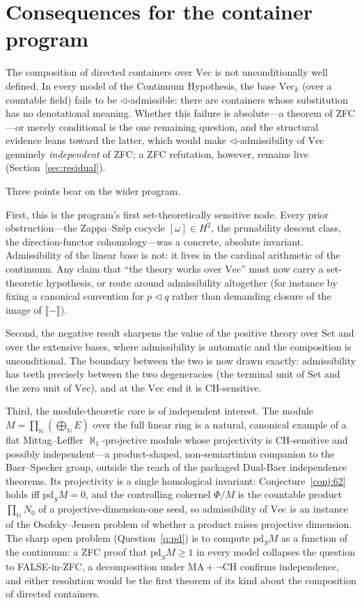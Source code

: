\documentclass[11pt,reqno]{amsart}
\theoremstyle{plain}
\theoremstyle{definition}
\theoremstyle{remark}
\renewcommand{\Vec}{\mathrm{Vec}}
\newcommand{\Set}{\mathrm{Set}}
\newcommand{\pd}{\mathrm{pd}}
\newcommand{\tri}{\triangleleft}
\newcommand{\den}[1]{\llbracket #1 \rrbracket}
\newcommand{\N}{\mathbb{N}}
\begin{document}
\section{Consequences for the container program}\label{sec:concl}

The composition of directed containers over $\Vec$ is not unconditionally well defined. In every model of the Continuum Hypothesis, the base $\Vec_k$ (over a countable field) fails to be $\tri$-admissible: there are containers whose substitution has no denotational meaning. Whether this failure is absolute---a theorem of ZFC---or merely conditional is the one remaining question, and the structural evidence leans toward the latter, which would make $\tri$-admissibility of $\Vec$ genuinely \emph{independent} of ZFC; a ZFC refutation, however, remains live (Section~\ref{sec:residual}).

Three points bear on the wider program.

First, this is the program's first set-theoretically sensitive node. Every prior obstruction---the Zappa--Sz\'ep cocycle $[\omega]\in H^2$, the prunability descent class, the direction-functor cohomology---was a concrete, absolute invariant. Admissibility of the linear base is not: it lives in the cardinal arithmetic of the continuum. Any claim that ``the theory works over $\Vec$'' must now carry a set-theoretic hypothesis, or route around admissibility altogether (for instance by fixing a canonical convention for $p\tri q$ rather than demanding closure of the image of $\den{-}$).

Second, the negative result sharpens the value of the positive theory over $\Set$ and over the extensive bases, where admissibility is automatic and the composition is unconditional. The boundary between the two is now drawn exactly: admissibility has teeth precisely between the two degeneracies (the terminal unit of $\Set$ and the zero unit of $\Vec$), and at the $\Vec$ end it is CH-sensitive.

Third, the module-theoretic core is of independent interest. The module $M=\prod_{\N}(\bigoplus_{\N}E)$ over the full linear ring is a natural, canonical example of a flat Mittag--Leffler $\aleph_1$-projective module whose projectivity is CH-sensitive and possibly independent---a product-shaped, non-semiartinian companion to the Baer--Specker group, outside the reach of the packaged Dual-Baer independence theorems. Its projectivity is a single homological invariant: Conjecture~\ref{conj:62} holds iff $\pd_S M=0$, and the controlling cokernel $\Phi/M$ is the countable product $\prod_{\N}N_0$ of a projective-dimension-one seed, so admissibility of $\Vec$ is an instance of the Osofsky--Jensen problem of whether a product raises projective dimension. The sharp open problem (Question~\ref{q:pd}) is to compute $\pd_S M$ as a function of the continuum: a ZFC proof that $\pd_S M\ge1$ in every model collapses the question to FALSE-in-ZFC, a decomposition under $\mathrm{MA}+\neg\mathrm{CH}$ confirms independence, and either resolution would be the first theorem of its kind about the composition of directed containers.
\end{document}
